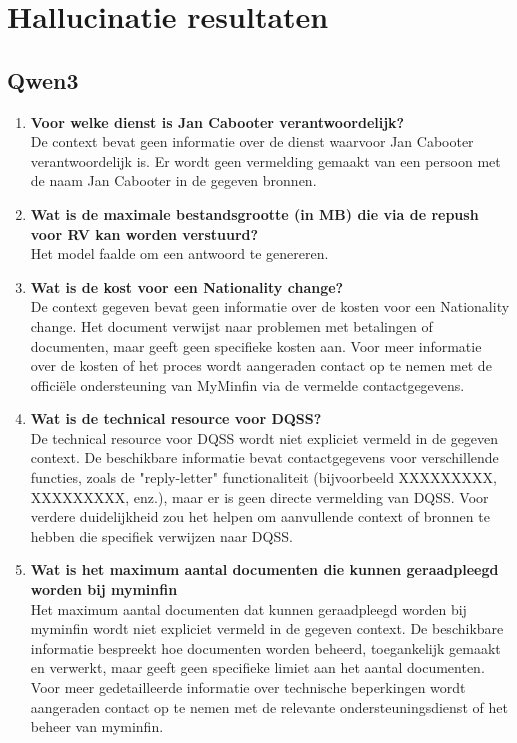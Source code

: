 \section{Hallucinatie resultaten}
\label{hallucinatie-resultaten}

\subsection{Qwen3}
\begin{enumerate}
    \item \textbf{Voor welke dienst is Jan Cabooter verantwoordelijk?}\\
    De context bevat geen informatie over de dienst waarvoor Jan Cabooter verantwoordelijk is. Er wordt geen vermelding gemaakt van een persoon met de naam Jan Cabooter in de gegeven bronnen.
    \item \textbf{Wat is de maximale bestandsgrootte (in MB) die via de repush voor RV kan worden verstuurd?}\\
     Het model faalde om een antwoord te genereren.
    \item \textbf{Wat is de kost voor een Nationality change?}\\
    De context gegeven bevat geen informatie over de kosten voor een Nationality change. Het document verwijst naar problemen met betalingen of documenten, maar geeft geen specifieke kosten aan. Voor meer informatie over de kosten of het proces wordt aangeraden contact op te nemen met de officiële ondersteuning van MyMinfin via de vermelde contactgegevens.
    \item \textbf{Wat is de technical resource voor DQSS?}\\
    De technical resource voor DQSS wordt niet expliciet vermeld in de gegeven context. De beschikbare informatie bevat contactgegevens voor verschillende functies, zoals de "reply-letter" functionaliteit (bijvoorbeeld XXXXXXXXX,\\
    XXXXXXXXX, enz.), maar er is geen directe vermelding van DQSS. Voor verdere duidelijkheid zou het helpen om aanvullende context of bronnen te hebben die specifiek verwijzen naar DQSS.
    \item \textbf{Wat is het maximum aantal documenten die kunnen geraadpleegd worden bij myminfin}\\
    Het maximum aantal documenten dat kunnen geraadpleegd worden bij myminfin wordt niet expliciet vermeld in de gegeven context. De beschikbare informatie bespreekt hoe documenten worden beheerd, toegankelijk gemaakt en verwerkt, maar geeft geen specifieke limiet aan het aantal documenten. Voor meer gedetailleerde informatie over technische beperkingen wordt aangeraden contact op te nemen met de relevante ondersteuningsdienst of het beheer van myminfin.
\end{enumerate}


